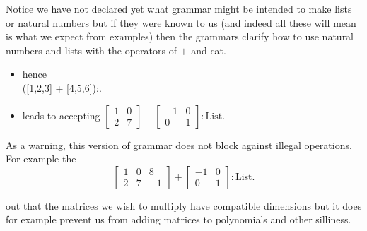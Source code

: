 Notice we have not declared yet what grammar might be intended to make 
lists or natural numbers but if they were known to us (and indeed 
all these will mean is what we expect from examples) then the grammars 
clarify how to use natural numbers and lists with the operators of 
$+$ and cat.

\begin{itemize}
\item 
     hence\\
    ([1,2,3] + [4,5,6]):. 

\item 
     leads to accepting
    $\displaystyle \begin{bmatrix} 1 & 0 \\ 2 & 7\end{bmatrix}
    + \begin{bmatrix} -1 & 0 \\ 0 & 1 \end{bmatrix}:\text{List}$. 
\end{itemize}
As a warning, this version of grammar does not block against 
illegal operations.  For example the 
\[
    \begin{bmatrix} 1 & 0 & 8 \\ 2 & 7 & -1\end{bmatrix}
+ \begin{bmatrix} -1 & 0 \\ 0 & 1 \end{bmatrix}:\text{List}.
\] 

out that the matrices we wish 
to multiply have compatible dimensions but it does for example 
prevent us from adding matrices to polynomials and other silliness.

